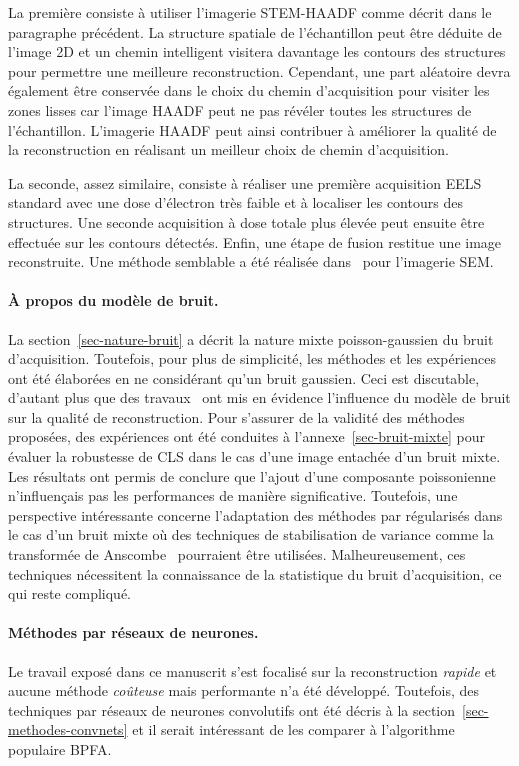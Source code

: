 La première consiste à utiliser l'imagerie STEM-HAADF comme décrit dans le paragraphe précédent. La structure spatiale de l'échantillon peut être déduite de l'image 2D et un chemin intelligent visitera davantage les contours des structures pour permettre une meilleure reconstruction. Cependant, une part aléatoire devra également être conservée dans le choix du chemin d'acquisition pour visiter les zones lisses car l'image HAADF peut ne pas révéler toutes les structures de l'échantillon. L'imagerie HAADF peut ainsi contribuer à améliorer la qualité de la reconstruction en réalisant un meilleur choix de chemin d'acquisition.

La seconde, assez similaire, consiste à réaliser une première acquisition EELS standard avec une dose d'électron très faible et à localiser les contours des structures. Une seconde acquisition à dose totale plus élevée peut ensuite être effectuée sur les contours détectés. Enfin, une étape de fusion restitue une image reconstruite. Une méthode semblable a été réalisée dans~\cite{dahmen2016feature} pour l'imagerie SEM. 


\paragraph{\`A propos du modèle de bruit.} La section~\ref{sec-nature-bruit} a décrit la nature mixte poisson-gaussien du bruit d'acquisition. Toutefois, pour plus de simplicité, les méthodes et les expériences ont été élaborées en ne considérant qu'un bruit gaussien. Ceci est discutable, d'autant plus que des travaux~\cite{sanders2020inpainting} ont mis en évidence l'influence du modèle de bruit sur la qualité de reconstruction. Pour s'assurer de la validité des méthodes proposées, des expériences ont été conduites à l'annexe~\ref{sec-bruit-mixte} pour évaluer la robustesse de CLS dans le cas d'une image entachée d'un bruit mixte. Les résultats ont permis de conclure que l'ajout d'une composante poissonienne n'influençais pas les performances de manière significative. Toutefois, une perspective intéressante concerne l'adaptation des méthodes par  régularisés dans le cas d'un bruit mixte où des techniques de stabilisation de variance comme la transformée de Anscombe~\cite{anscombe1948transformation} pourraient être utilisées. Malheureusement, ces techniques nécessitent la connaissance de la statistique du bruit d'acquisition, ce qui reste compliqué.


\paragraph{Méthodes par réseaux de neurones.} Le travail exposé dans ce manuscrit s'est focalisé sur la reconstruction \emph{rapide} et aucune méthode \emph{coûteuse} mais performante n'a été développé. Toutefois, des techniques par réseaux de neurones convolutifs ont été décris à la section~\ref{sec-methodes-convnets} et il serait intéressant de les comparer à l'algorithme populaire BPFA.






